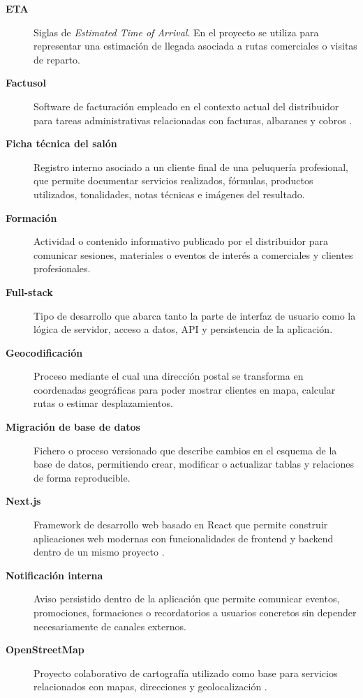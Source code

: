 \begin{description}
\item[\textbf{ETA}]
Siglas de \textit{Estimated Time of Arrival}. En el proyecto se utiliza para representar una estimación de llegada asociada a rutas comerciales o visitas de reparto.

\item[\textbf{Factusol}]
Software de facturación empleado en el contexto actual del distribuidor para tareas administrativas relacionadas con facturas, albaranes y cobros \citep{sdelsol-factusol}.

\item[\textbf{Ficha técnica del salón}]
Registro interno asociado a un cliente final de una peluquería profesional, que permite documentar servicios realizados, fórmulas, productos utilizados, tonalidades, notas técnicas e imágenes del resultado.

\item[\textbf{Formación}]
Actividad o contenido informativo publicado por el distribuidor para comunicar sesiones, materiales o eventos de interés a comerciales y clientes profesionales.

\item[\textbf{Full-stack}]
Tipo de desarrollo que abarca tanto la parte de interfaz de usuario como la lógica de servidor, acceso a datos, API y persistencia de la aplicación.

\item[\textbf{Geocodificación}]
Proceso mediante el cual una dirección postal se transforma en coordenadas geográficas para poder mostrar clientes en mapa, calcular rutas o estimar desplazamientos.

\item[\textbf{Migración de base de datos}]
Fichero o proceso versionado que describe cambios en el esquema de la base de datos, permitiendo crear, modificar o actualizar tablas y relaciones de forma reproducible.

\item[\textbf{Next.js}]
Framework de desarrollo web basado en React que permite construir aplicaciones web modernas con funcionalidades de frontend y backend dentro de un mismo proyecto \citep{nextjsdocs2026,reactdocs2026}.

\item[\textbf{Notificación interna}]
Aviso persistido dentro de la aplicación que permite comunicar eventos, promociones, formaciones o recordatorios a usuarios concretos sin depender necesariamente de canales externos.

\item[\textbf{OpenStreetMap}]
Proyecto colaborativo de cartografía utilizado como base para servicios relacionados con mapas, direcciones y geolocalización \citep{openstreetmap-about}.


\end{description}
